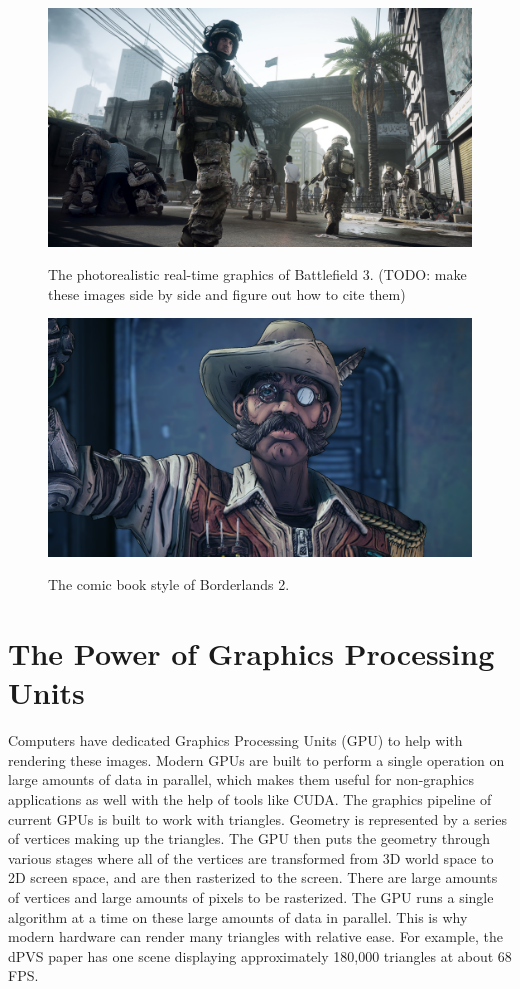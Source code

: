 \documentclass[12pt]{ucthesis}
\newcommand{\captionfonts}{\small\bf\ssp}
\begin{document}
\begin{figure}
\begin{center}
\includegraphics[width=\textwidth]{Images/BF3.jpg}
\captionfonts
\caption[Battlefield 3]{The photorealistic real-time graphics of Battlefield 3. (TODO: make these images side by side and figure out how to cite them)}
\label{fig:bf3}
\includegraphics[width=\textwidth]{Images/Borderlands_2.png}
\captionfonts
\caption[Borderlands 2]{The comic book style of Borderlands 2.}
\label{fig:borderlands2}
\end{center}
\end{figure}

\section{The Power of Graphics Processing Units}
\label{gpu}
Computers have dedicated Graphics Processing Units (GPU) to help with rendering these images.
Modern GPUs are built to perform a single operation on large amounts of data in parallel, which makes them useful for non-graphics applications as well with the help of tools like CUDA.\cite{FermiArch}
The graphics pipeline of current GPUs is built to work with triangles.\cite{d3d11-pipeline}
Geometry is represented by a series of vertices making up the triangles.
The GPU then puts the geometry through various stages where all of the vertices are transformed from 3D world space to 2D screen space, and are then rasterized to the screen.
There are large amounts of vertices and large amounts of pixels to be rasterized.
The GPU runs a single algorithm at a time on these large amounts of data in parallel.
This is why modern hardware can render many triangles with relative ease.
For example, the dPVS paper has one scene displaying approximately 180,000 triangles at about 68 FPS.\cite{dpvs}
\end{document}
